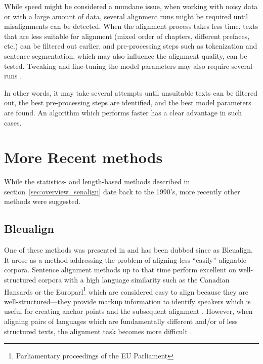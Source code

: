 While speed might be considered a mundane issue, when working with noisy data or with a large amount of data, several alignment runs might be required until misalignments can be detected. 
When the alignment process takes less time,  texts that are less suitable for alignment (mixed order of chapters, different prefaces, etc.) 
can be filtered out earlier, and pre-processing steps such as tokenization and sentence segmentation, which may also influence the alignment quality, can be tested. 
Tweaking and fine-tuning the model parameters may also require several runs \autocite{hunalign}. 

In other words, it may take several attempts until unsuitable texts can be filtered out, the best pre-processing steps are identified, and the best model parameters are found. 
An algorithm which performs faster has a clear advantage in such cases.


\section{More Recent methods}
While the statistics- and length-based  methods described in section~\ref{sec:overview_senalign} date back to the 1990's, more recently other methods were suggested.

\subsection{Bleualign}

One of these methods was presented in \cite{sennrich-volk-2010-mt} and has been dubbed since as Bleualign. 
It arose as a method addressing  the problem of aligning less \enquote{easily} alignable corpora. 
Sentence alignment methods up to that time perform excellent on well-structured corpora with a high language similarity such as the Canadian Hansards  or the Europarl\footnote{Parliamentary proceedings of the EU Parliament}  which are considered easy to align because they are well-structured---they provide markup information to identify speakers which is useful for creating anchor points and the subsequent alignment \autocites{simard-plamondon-1996-bilingual,sennrich-volk-2011-iterative}. 
However, when aligning pairs of languages which are fundamentally different and/or of less structured texts, the alignment task becomes more difficult \autocite{sennrich-volk-2010-mt}.

